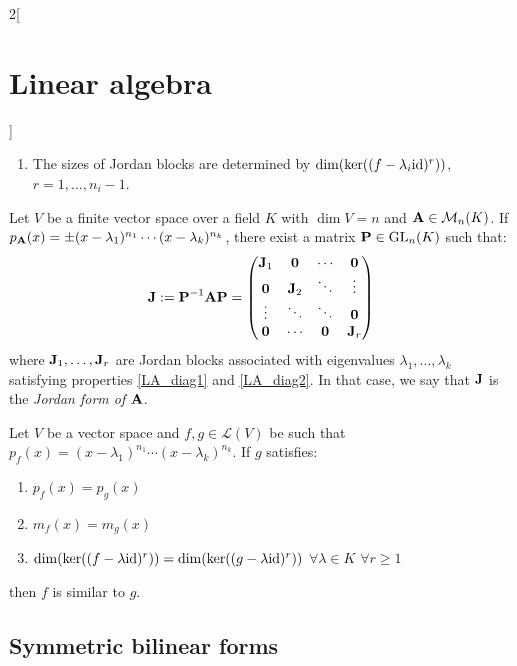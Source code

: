 \documentclass[../../../main.tex]{subfiles}
\begin{document}
\begin{multicols}{2}[\section{Linear algebra}]
\begin{prop}
\begin{enumerate}
      \item\label{LA_diag2} The sizes of Jordan blocks are determined by $\dim(\ker((f-\lambda_i\mathrm{id})^r))$, $r=1,\ldots,n_i-1$.
    \end{enumerate}
  \end{prop}
  \begin{prop}
    Let $V$ be a finite vector space over a field $K$ with $\dim V=n$ and $\boldsymbol{\mathrm{A}}\in\mathcal{M}_n(K)$. If $p_{\boldsymbol{\mathrm{A}}}(x)=\pm(x-\lambda_1)^{n_1}\cdots(x-\lambda_k)^{n_k}$, there exist a matrix $\boldsymbol{\mathrm{P}}\in\mathrm{GL}_n(K)$ such that:
    $$\boldsymbol{\mathrm{J}}:=\boldsymbol{\mathrm{P}}^{-1}\boldsymbol{\mathrm{A}}\boldsymbol{\mathrm{P}}=
      \begin{pmatrix}
        \boldsymbol{\mathrm{J}}_1 & \boldsymbol{\mathrm{0}}   & \cdots             & \boldsymbol{\mathrm{0}}   \\
        \boldsymbol{\mathrm{0}}   & \boldsymbol{\mathrm{J}}_2 & \ddots             & \vdots               \\
        \vdots               & \ddots               & \ddots             & \boldsymbol{\mathrm{0}}   \\
        \boldsymbol{\mathrm{0}}   & \cdots               & \boldsymbol{\mathrm{0}} & \boldsymbol{\mathrm{J}}_r \\
      \end{pmatrix}
    $$
    where $\boldsymbol{\mathrm{J}}_1,\ldots,\boldsymbol{\mathrm{J}}_r$ are Jordan blocks associated with eigenvalues $\lambda_1,\ldots,\lambda_k$ satisfying properties \ref{LA_diag1} and \ref{LA_diag2}. In that case, we say that $\boldsymbol{\mathrm{J}}$ is the \textit{Jordan form of $\boldsymbol{\mathrm{A}}$}.
  \end{prop}
  \begin{theorem}
    Let $V$ be a vector space and $f,g\in\mathcal{L}(V)$ be such that $p_f(x)=(x-\lambda_1)^{n_1}\cdots(x-\lambda_k)^{n_k}$. If $g$ satisfies:
    \begin{enumerate}
      \item $p_f(x)=p_g(x)$
      \item $m_f(x)=m_g(x)$
      \item $\dim(\ker((f-\lambda \mathrm{id})^r))=\dim(\ker((g-\lambda \mathrm{id})^r))$ $\forall\lambda\in K$ $\forall r\geq 1$
    \end{enumerate}
    then $f$ is similar to $g$.
  \end{theorem}
  \subsection{Symmetric bilinear forms}

\end{multicols}
\end{document}
